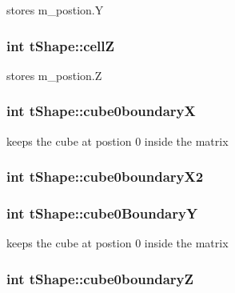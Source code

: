 stores m\-\_\-postion.\-Y \hypertarget{classt_shape_a472e4925e0aaa875df22dab7a6ed3551}{
\subsubsection[{cell\-Z}]{\setlength{\rightskip}{0pt plus 5cm}int t\-Shape\-::cell\-Z}}\label{classt_shape_a472e4925e0aaa875df22dab7a6ed3551}
stores m\-\_\-postion.\-Z \hypertarget{classt_shape_a2df1bbbd7e785bd17cd4d63e8b3a6869}{
\subsubsection[{cube0boundary\-X}]{\setlength{\rightskip}{0pt plus 5cm}int t\-Shape\-::cube0boundary\-X}}\label{classt_shape_a2df1bbbd7e785bd17cd4d63e8b3a6869}
keeps the cube at postion 0 inside the matrix \hypertarget{classt_shape_ac4ca3540f5d00586160f68272f60b060}{
\subsubsection[{cube0boundary\-X2}]{\setlength{\rightskip}{0pt plus 5cm}int t\-Shape\-::cube0boundary\-X2}}\label{classt_shape_ac4ca3540f5d00586160f68272f60b060}
\hypertarget{classt_shape_ab536ba2d1c2fc3e4f367ecf936e49f14}{
\subsubsection[{cube0\-Boundary\-Y}]{\setlength{\rightskip}{0pt plus 5cm}int t\-Shape\-::cube0\-Boundary\-Y}}\label{classt_shape_ab536ba2d1c2fc3e4f367ecf936e49f14}
keeps the cube at postion 0 inside the matrix \hypertarget{classt_shape_a6c726e8afc0847cea65901b74bb0f1a4}{
\subsubsection[{cube0boundary\-Z}]{\setlength{\rightskip}{0pt plus 5cm}int t\-Shape\-::cube0boundary\-Z}}\label{classt_shape_a6c726e8afc0847cea65901b74bb0f1a4}
